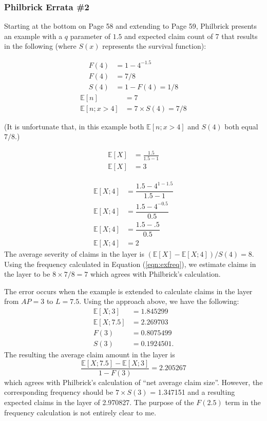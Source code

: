 \documentclass[]{article} %
\begin{document}
\subsubsection{Philbrick Errata \#2}
Starting at the bottom on Page 58 and extending to Page 59, Philbrick presents an example with a $q$ parameter of $1.5$ and expected claim count of 7 that results in the following (where $S(x)$ represents the survival function):

\begin{align}
F(4) &= 1 - 4^{-1.5}\nonumber\\
F(4) &= 7/8\nonumber\\
S(4) &= 1 - F(4) = 1/8\nonumber
\end{align}
\begin{align}
\mathbb{E}[n] &= 7\nonumber\\
\mathbb{E}[n; x > 4] &= 7 \times S(4) = 7/8\label{eqn:exfreq}
\end{align}

(It is unfortunate that, in this example both $\mathbb{E}[n; x > 4]$ and $S(4)$ both equal $7/8$.)

\begin{align}
\mathbb{E}[X] &= \frac{1.5}{1.5-1}\nonumber\\
\mathbb{E}[X] &= 3\nonumber
\end{align}

\begin{align}
\mathbb{E}[X; 4] &= \dfrac{1.5 - 4^{1-1.5}}{1.5-1}\nonumber\\
\mathbb{E}[X; 4] &= \dfrac{1.5 - 4^{-0.5}}{0.5}\nonumber\\
\mathbb{E}[X; 4] &= \dfrac{1.5 - .5}{0.5}\nonumber\\
\mathbb{E}[X; 4] &= 2\nonumber
\end{align}
The average severity of claims in the layer is $(\mathbb{E}[X] - \mathbb{E}[X; 4]) / S(4) = 8$. Using the frequency calculated in Equation (\ref{eqn:exfreq}), we estimate claims in the layer to be $8 \times 7 / 8 = 7$ which agrees with Philbrick's calculation.

The error occurs when the example is extended to calculate claims in the layer from $AP = 3$ to $L = 7.5$. Using the approach above, we have the following:
\begin{align}
\mathbb{E}[X;3] &= 1.845299\nonumber\\
\mathbb{E}[X;7.5] &= 2.269703\nonumber\\
F(3) &= 0.8075499\nonumber\\
S(3) &= 0.1924501.\nonumber
\end{align}
The resulting the average claim amount in the layer is 
\begin{equation}
\frac{\mathbb{E}[X;7.5] - \mathbb{E}[X;3]}{1 - F(3)} = 2.205267 \nonumber
\end{equation}
which agrees with Philbrick's calculation of ``net average claim size''. However, the corresponding frequency should be $ 7 \times S(3)$ = 1.347151 and a resulting expected claims in the layer of 2.970827. The purpose of the $F(2.5)$ term in the frequency calculation is not entirely clear to me. 
\end{document}
